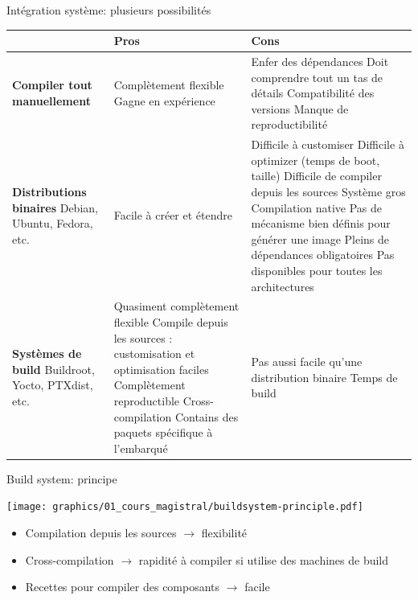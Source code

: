\begin{frame}{Intégration système: plusieurs possibilités}
  \tiny
  \begin{tabularx}{14cm}{|X|X|X|}
    \hline
    & {\bf Pros} & {\bf Cons} \\
    \hline
    {\bf Compiler tout manuellement} &
    Complètement flexible \newline
    Gagne en expérience &
    Enfer des dépendances \newline
    Doit comprendre tout un tas de détails \newline
    Compatibilité des versions \newline
    Manque de reproductibilité \\
    \hline
    {\bf Distributions binaires} \newline Debian, Ubuntu, Fedora, etc.
    &
    Facile à créer et étendre
    &
    Difficile à customiser \newline
    Difficile à optimizer (temps de boot, taille) \newline
    Difficile de compiler depuis les sources \newline
    Système gros \newline
    Compilation native \newline
    Pas de mécanisme bien définis pour générer une image \newline
    Pleins de dépendances obligatoires \newline
    Pas disponibles pour toutes les architectures \\
    \hline
    {\bf Systèmes de build} \newline Buildroot, Yocto, PTXdist, etc.
    &
    Quasiment complètement flexible \newline
    Compile depuis les sources : customisation et optimisation faciles \newline
    Complètement reproductible \newline
    Cross-compilation \newline
    Contains des paquets spécifique à l'embarqué \newline
    &
    Pas aussi facile qu'une distribution binaire \newline
    Temps de build \\
    \hline
  \end{tabularx}
\end{frame}

\begin{frame}{Build system: principe}
  \begin{center}
    \texttt{[image: graphics/01\_cours\_magistral/buildsystem-principle.pdf]}
  \end{center}
  \begin{itemize}
  \item Compilation depuis les sources $\rightarrow$ flexibilité
  \item Cross-compilation $\rightarrow$ rapidité à compiler si utilise des machines de build
  \item Recettes pour compiler des composants $\rightarrow$ facile
  \end{itemize}
\end{frame}

